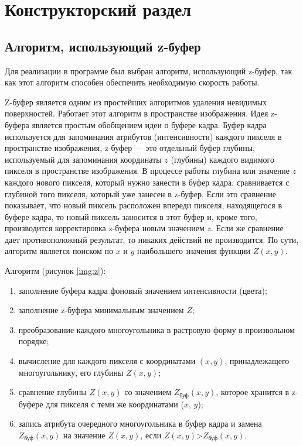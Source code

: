 \chapter{Конструкторский раздел}

\section{Алгоритм, использующий z-буфер}

Для реализации в программе был выбран алгоритм, использующий z-буфер, так как этот алгоритм способен обеспечить необходимую скорость работы.

Z-буфер является одним из простейших алгоритмов удаления невидимых поверхностей. Работает этот алгоритм в пространстве изображения. Идея z-буфера является простым обобщением идеи о буфере кадра. Буфер кадра используется для запоминания атрибутов (интенсивности) каждого пикселя в пространстве изображения, z-буфер --- это отдельный буфер глубины, используемый для запоминания координаты $z$ (глубины) каждого видимого пикселя в пространстве изображения. В процессе работы глубина или значение $z$ каждого нового пикселя, который нужно занести в буфер кадра, сравнивается с глубиной того пикселя, который уже занесен в z-буфер. Если это сравнение показывает, что новый пиксель расположен впереди пикселя, находящегося в буфере кадра, то новый пиксель заносится в этот буфер и, кроме того, производится корректировка z-буфера новым значением $z$. Если же сравнение дает противоположный результат, то никаких действий не производится. По сути, алгоритм является поиском по $x$ и $y$ наибольшего значения функции $Z(x, y)$. 

Алгоритм (рисунок \ref{img:z}):
\begin{enumerate}[label=\arabic*)]
    \item заполнение буфера кадра фоновый значением интенсивности (цвета);
    \item заполнение z-буфера минимальным значением $Z$;
    \item преобразование каждого многоугольника в растровую форму в произвольном порядке;
    \item вычисление для каждого пикселя с координатами $(x, y)$, принадлежащего многоугольнику, его глубины $Z(x, y)$;
    \item сравнение глубины $Z(x, y)$ со значением $Z_{\text{буф}}(x, y)$, которое хранится в z-буфере для пикселя с теми же координатами ($x$, $y$);
    \item запись атрибута очередного многоугольника в буфер кадра и замена $Z_{\text{буф}}(x, y)$ на значение $Z(x, y)$, если $Z(x, y)$>$Z_{\text{буф}}(x, y)$.
\end{enumerate}

